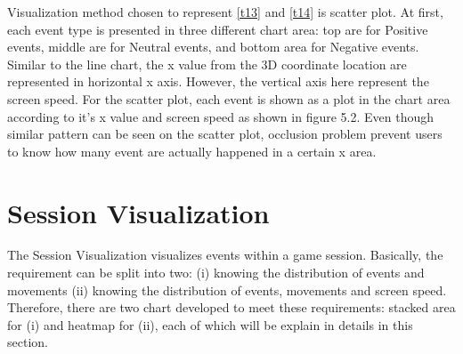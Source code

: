 Visualization method chosen to represent \ref{t13} and \ref{t14} is scatter plot. At first, each event type is presented in three different chart area: top are for Positive events, middle are for Neutral events, and bottom area for Negative events. Similar to the line chart, the x value from the 3D coordinate location are represented in horizontal x axis. However, the vertical axis here represent the screen speed. For the scatter plot, each event is shown as a plot in the chart area according to it's x value and screen speed as shown in figure 5.2. Even though similar pattern can be seen on the scatter plot, occlusion problem prevent users to know how many event are actually happened in a certain x area.

\section{Session Visualization}
The Session Visualization visualizes events within a game session. Basically, the requirement can be split into two: (i) knowing the distribution of events and movements (ii) knowing the distribution of events, movements and screen speed. Therefore, there are two chart developed to meet these requirements: stacked area for (i) and heatmap for (ii), each of which will be explain in details in this section.

